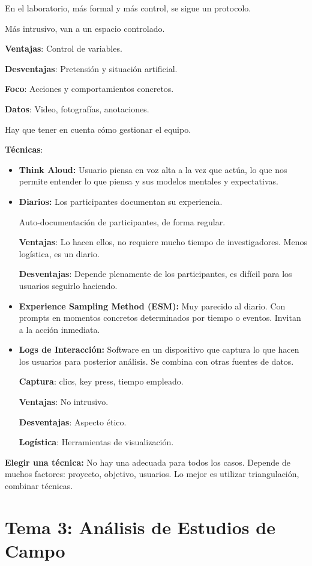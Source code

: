 \documentclass[12pt, twoside, openright]{report} %
\begin{document}
En el laboratorio, más formal y más control, se sigue un protocolo.

Más intrusivo, van a un espacio controlado.

\textbf{Ventajas}: Control de variables.

\textbf{Desventajas}: Pretensión y situación artificial.

\textbf{Foco}: Acciones y comportamientos concretos.

\textbf{Datos}: Video, fotografías, anotaciones.

Hay que tener en cuenta cómo gestionar el equipo.

\textbf{Técnicas}:
\begin{itemize}
  \item \textbf{Think Aloud:} Usuario piensa en voz alta a la vez que
  actúa, lo que nos permite entender lo que piensa y sus modelos mentales
  y expectativas.
  \item \textbf{Diarios:} Los participantes documentan su experiencia.
  
  Auto-documentación de participantes, de forma regular.

  \textbf{Ventajas}: Lo hacen ellos, no requiere mucho tiempo
  de investigadores. Menos logística, es un diario.

  \textbf{Desventajas}: Depende plenamente de los
  participantes, es difícil para los usuarios seguirlo haciendo.
  \item \textbf{Experience Sampling Method (ESM):} Muy parecido al
  diario. Con prompts en momentos concretos determinados por tiempo o
  eventos. Invitan a la acción inmediata.
  \item \textbf{Logs de Interacción:} Software en un dispositivo
  que captura lo que hacen los usuarios para posterior análisis.     Se combina con otras fuentes de datos.

  
    \textbf{Captura}: clics, key press, tiempo empleado.

    \textbf{Ventajas}: No intrusivo.

    \textbf{Desventajas}: Aspecto ético.

    \textbf{Logística}: Herramientas de visualización.
\end{itemize}

\textbf{Elegir una técnica:} No hay una adecuada para todos los casos.
Depende de muchos factores: proyecto, objetivo, usuarios. Lo mejor es utilizar triangulación, combinar técnicas.

\chapter{Tema 3: Análisis de Estudios de
Campo}
\end{document}
